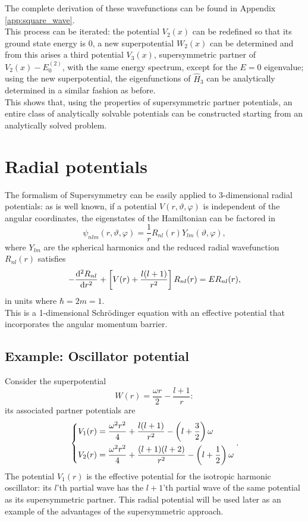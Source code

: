 The complete derivation of these wavefunctions can be found in Appendix
\ref{app:square_wave}.\\

This process can be iterated: the potential $V_2(x)$ can be redefined so that
its ground state energy is $0$, a new superpotential $W_2(x)$ can be determined and from this
arises a third potential $V_3(x)$, supersymmetric partner of $V_2(x)-E^{(2)}_0$, with the same
energy spectrum,
except for the $E=0$ eigenvalue; using the new superpotential, the eigenfunctions of $\hat H_3$
can be analytically determined in a similar fashion as before.
\\

This shows that, using the properties of supersymmetric partner potentials, an entire class of
analytically solvable potentials can be constructed starting from an analytically solved problem.

\section{Radial potentials}
The formalism of Supersymmetry can be easily applied to 3-dimensional radial potentials:
as is well known, if a potential $V(r,\vartheta,\varphi)$ is independent of the angular
coordinates, the eigenstates of the Hamiltonian can be factored in
$$\psi_{nlm}(r,\vartheta,\varphi) = \frac{1}{r}R_{nl}(r)Y_{lm}(\vartheta,\varphi),$$
where $Y_{lm}$ are the spherical harmonics and the reduced radial wavefunction $R_{nl}(r)$
satisfies
$$- \dv[2]{R_{nl}}{r}+\left[V(r)+\frac{l(l+1)}{r^2}\right]R_{nl}(r)=ER_{nl}(r),$$
in units where $\hbar=2m=1$.\\
This is a 1-dimensional Schrödinger equation with an effective potential that incorporates
the angular momentum barrier.

\subsection{Example: Oscillator potential}
Consider the superpotential
\begin{equation}
W(r) = \frac{\omega r}{2}-\frac{l+1}{r}:
\label{eq:osc_superpot}
\end{equation}
its associated partner potentials are
\begin{equation}
\begin{dcases}
V_1(r)=\frac{\omega^2r^2}{4}+\frac{l(l+1)}{r^2}-\left(l+\frac{3}{2}\right)\omega\\
V_2(r)=\frac{\omega^2r^2}{4}+\frac{(l+1)(l+2)}{r^2}-\left(l+\frac{1}{2}\right)\omega
\label{eq:osc_pot}
\end{dcases}.
\end{equation}
The potential $V_1(r)$ is the effective potential for the isotropic harmonic oscillator: its
$l$'th partial wave has the $l+1$'th partial wave of the same potential as its supersymmetric
partner. This radial potential will be used later as an example of the advantages of the 
supersymmetric approach.


